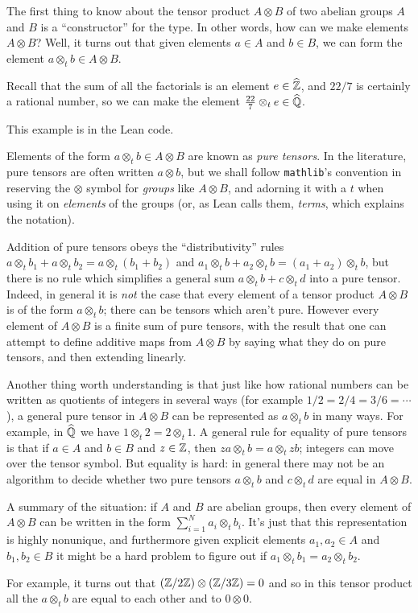 The first thing to know about the tensor product $A\otimes B$ of two abelian groups $A$ and $B$
is a ``constructor'' for the type. In other words, how can we make elements $A\otimes B$?
Well, it turns out that given elements $a\in A$ and $b\in B$, we can form the element 
$a\otimes_t b\in A\otimes B$. 

\begin{example} Recall that the sum of all the factorials is an element $e\in\widehat{\mathbb{Z}}$, and $22/7$ is certainly
a rational number, so we can make the element $\frac{22}{7}\otimes_te\in\widehat{\mathbb{Q}}$.
\end{example}

This example is in the Lean code.

Elements of the form $a\otimes_t b\in A\otimes B$ are known as \emph{pure tensors}. In the 
literature, pure tensors
are often written $a\otimes b$, but we shall follow {\tt mathlib}'s convention in reserving
the $\otimes$ symbol for \emph{groups} like $A \otimes B$, and adorning it with a $t$ when
using it on \emph{elements} of the groups (or, as Lean calls them, \emph{terms}, which explains
the notation).

Addition of pure tensors obeys the ``distributivity'' rules 
$a\otimes_t b_1+a\otimes_t b_2=a\otimes_t(b_1+b_2)$ and 
$a_1\otimes_t b+a_2\otimes_t b=(a_1+a_2)\otimes_t b$, but there is no rule which simplifies
a general sum $a\otimes_t b + c\otimes_t d$ into a pure tensor. Indeed, in general it is \emph{not}
the case that every element of a tensor product $A\otimes B$ is of the form $a\otimes_t b$; there can be
tensors which aren't pure. However every element of $A\otimes B$ is a finite sum of pure tensors, 
with the result that one can attempt to define additive maps from $A\otimes B$ by saying what they 
do on pure tensors, and then extending linearly.

Another thing worth understanding is that just like how rational numbers can be written as 
quotients of integers in several ways (for example $1/2=2/4=3/6=\cdots$), a general pure tensor 
in $A\otimes B$ can be represented as $a\otimes_t b$ in many ways. For example, in $\widehat{\mathbb{Q}}$
we have $1\otimes_t 2=2\otimes_t 1$. A general rule for equality of pure tensors is that if 
$a\in A$ and $b\in B$ and $z\in\mathbb{Z}$, then $za\otimes_tb=a\otimes_tzb$; integers can move over the 
tensor symbol. But equality is hard: in general there may not be an algorithm to decide
whether two pure tensors $a\otimes_t b$ and $c\otimes_t d$ are equal in $A\otimes B$.

\begin{remark} A summary of the situation: if $A$ and $B$ are abelian groups, then every element
    of $A\otimes B$ can be written in the form $\sum_{i=1}^Na_i\otimes_tb_i$. It's just that this
    representation is highly nonunique, and furthermore given explicit elements $a_1,a_2\in A$
    and $b_1,b_2\in B$ it might be a hard problem to figure out if 
    $a_1\otimes_t b_1=a_2\otimes_t b_2$. 
    
    For example, it turns out that $(\mathbb{Z}/2\mathbb{Z})\otimes(\mathbb{Z}/3\mathbb{Z})=0$
    and so in this tensor product all the $a\otimes_t b$ are equal to each other and to $0\otimes 0$.
\end{remark}

